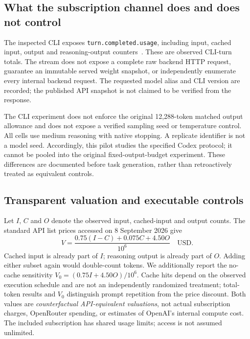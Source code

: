 \subsection{What the subscription channel does and does not control}
The inspected CLI exposes \texttt{turn.completed.usage}, including input, cached input, output and reasoning-output counters~\cite{codexexec2026}. These are observed CLI-turn totals. The stream does not expose a complete raw backend HTTP request, guarantee an immutable served weight snapshot, or independently enumerate every internal backend request. The requested model alias and CLI version are recorded; the published API snapshot is not claimed to be verified from the response.

The CLI experiment does not enforce the original 12,288-token matched output allowance and does not expose a verified sampling seed or temperature control. All cells use medium reasoning with native stopping. A replicate identifier is not a model seed. Accordingly, this pilot studies the specified Codex protocol; it cannot be pooled into the original fixed-output-budget experiment. These differences are documented before task generation, rather than retroactively treated as equivalent controls.

\subsection{Transparent valuation and executable controls}
Let $I$, $C$ and $O$ denote the observed input, cached-input and output counts. The standard API list prices accessed on 8 September 2026 give
\begin{equation}
 V=\frac{0.75(I-C)+0.075C+4.50O}{10^6}\quad\mathrm{USD}.
\end{equation}
Cached input is already part of $I$; reasoning output is already part of $O$. Adding either subset again would double-count tokens. We additionally report the no-cache sensitivity $V_0=(0.75I+4.50O)/10^6$. Cache hits depend on the observed execution schedule and are not an independently randomized treatment; total-token results and $V_0$ distinguish prompt repetition from the price discount. Both values are \emph{counterfactual API-equivalent valuations}, not actual subscription charges, OpenRouter spending, or estimates of OpenAI's internal compute cost. The included subscription has shared usage limits; access is not assumed unlimited.


